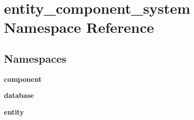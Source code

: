 \section{entity\+\_\+component\+\_\+system Namespace Reference}
\label{namespaceentity__component__system}
\subsection*{Namespaces}
\begin{DoxyCompactItemize}
\item 
 {\bf component}
\item 
 {\bf database}
\item 
 {\bf entity}
\end{DoxyCompactItemize}
